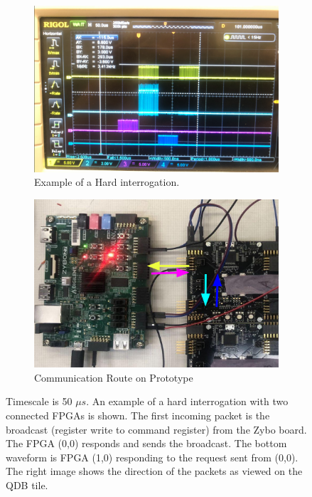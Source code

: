 \begin{figure}
\centering
\begin{subfigure}{0.475\textwidth}
  \centering
  \includegraphics[width=\textwidth]{images/qdb_example_packet_waveform.png}
  \caption{Example of a Hard interrogation.}
\end{subfigure}%
\begin{subfigure}{0.475\textwidth}
  \centering
  \includegraphics[width=\textwidth]{images/qdb_example_packet_waveform_diagram.png}
  \caption{Communication Route on Prototype}
\end{subfigure}
\caption{Timescale is 50 $\unit{\mu s}$.
An example of a hard interrogation with two connected FPGAs is shown.
The first incoming packet is the broadcast (register write to command register) from the Zybo board.
The FPGA (0,0) responds and sends the broadcast.
The bottom waveform is FPGA (1,0) responding to the request sent from (0,0).
The right image shows the direction of the packets as viewed on the QDB tile.
}
\label{fig:example_broadcast}
\end{figure}

